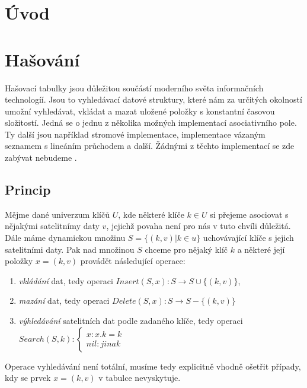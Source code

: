 
\chapter{Úvod}


\chapter{Hašování}
\label{sec:hashing}
Hašovací tabulky jsou důležitou součástí moderního světa informačních 
technologíí. Jsou to vyhledávací datové struktury, které nám za určitých
okolností umožní vyhledávat, vkládat a mazat uložené položky s konstantní
časovou složitostí. Jedná se o jednu z několika možných implementací
asociativního pole. Ty další jsou například stromové implementace, 
implementace vázaným seznamem s lineáním průchodem a další. Žádnými
z těchto implementací se zde zabývat nebudeme \cite{art_of_programming}.

\section{Princip}
Mějme dané univerzum klíčů $U$, kde některé klíče $k \in U$ si přejeme
asociovat s nějakými satelitnímy daty $v$, jejichž povaha není pro nás v
tuto chvíli důležitá. Dále máme dynamickou množinu $S = \{(k,v) | k \in u\}$
uchovávající klíče s jejich satelitními daty. Pak nad množinou $S$ chceme
pro nějaký klíč $k$ a některé její položky $x=(k, v)$ provádět následující 
operace: 

\begin{enumerate}
	\item \textit{vkládání} dat, tedy operaci 
		$Insert(S,x) : S \to S \cup \{(k, v)\} $,

	\item \textit{mazání} dat, tedy operaci 
		$Delete(S,x) : S \to S - \{(k, v)\}$

	\item \textit{výhledávání} satelitních dat podle zadaného klíče,
		tedy operaci \newline $Search(S,k) : 
			\begin{cases}
				x 	: x.k = k \\
				nil : jinak 
			\end{cases} $
\end{enumerate}

Operace vyhledávání není totální, musíme tedy explicitně vhodně ošetřit
případy, kdy se prvek $x=(k,v)$ v tabulce nevyskytuje.


